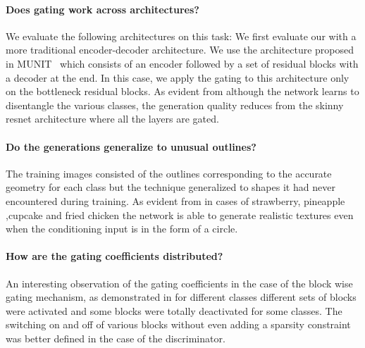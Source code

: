 
\paragraph{Does gating work across architectures?} 
We evaluate the following architectures on this task: 
We first evaluate our  with a more traditional encoder-decoder architecture. 
We use the architecture proposed in MUNIT~\cite{huang2018multimodal} which consists of an encoder followed by a set of residual blocks with a decoder at the end.
In this case, we apply the gating to this architecture only on the bottleneck residual blocks.
As evident from  although the network learns to disentangle the various classes, the generation quality reduces from the skinny resnet architecture where all the layers are gated.


\paragraph{Do the generations generalize to unusual outlines?} The training images consisted of the outlines corresponding to the accurate geometry for each class but the technique generalized to shapes it had never encountered during training. As evident from  in cases of strawberry, pineapple ,cupcake and fried chicken the network is able to generate realistic textures even when the conditioning input is in the form of a circle.

\paragraph{How are the gating coefficients distributed?}
An interesting observation of the gating coefficients in the case of the block wise gating mechanism, as demonstrated in  for different classes different sets of blocks were activated and some blocks were totally deactivated for some classes. The switching on and off of various blocks without even adding a sparsity constraint was better defined in the case of the discriminator.


